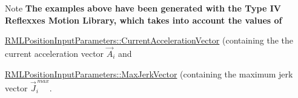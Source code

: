 \begin{DoxyNote}{Note}
{\bfseries{The examples above have been generated with the Type IV Reflexxes Motion Library, which takes into account the values of}}~\newline
~\newline

\begin{DoxyItemize}
\item \mbox{\hyperlink{classRMLInputParameters_a423bf4b1ef337cbf6eee22fe2e2502c1}{R\+M\+L\+Position\+Input\+Parameters\+::\+Current\+Acceleration\+Vector}} (containing the the current acceleration vector $ \vec{A}_i$ and 
\item \mbox{\hyperlink{classRMLInputParameters_a5968ce643868260410f149996c446b66}{R\+M\+L\+Position\+Input\+Parameters\+::\+Max\+Jerk\+Vector}} (containing the maximum jerk vector $ \vec{J}_i^{\,max} $. ~\newline
~\newline
 
\end{DoxyItemize}
\end{DoxyNote}
~\newline
